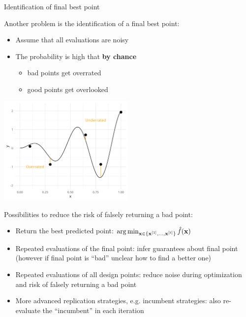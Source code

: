 \documentclass[11pt,compress,t,notes=noshow, xcolor=table]{beamer}
\begin{document}
\begin{vbframe}{Identification of final best point}

Another problem is the identification of a final best point: 

\begin{itemize}
  \item Assume that all evaluations are noisy
  \item The probability is high that \textbf{by chance}
  \begin{itemize}
    \item bad points get overrated 
    \item good points get overlooked
  \end{itemize}
\end{itemize}


\begin{center}
  \includegraphics[width = 0.5\textwidth]{figure_man/noisy_5.png}
\end{center}

\framebreak 

Possibilities to reduce the risk of falsely returning a bad point: 
\begin{itemize}
  \item Return the best predicted point: $\operatorname{arg\,min}_{\mathbf{x} \in \{\mathbf{x}^{[1]}, \ldots, \mathbf{x}^{[t]}\}} \hat{f}(\mathbf{x})$
  \item Repeated evaluations of the final point: infer guarantees about final point (however if final point is \enquote{bad} unclear how to find a better one)
  \item Repeated evaluations of all design points: reduce noise during optimization and risk of falsely returning a bad point
  \item More advanced replication strategies, e.g. incumbent strategies: also re-evaluate the \enquote{incumbent} in each iteration
\end{itemize}

\end{vbframe}


\endlecture
\end{document}
